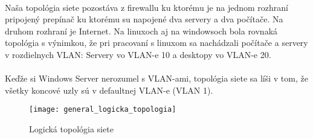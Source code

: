 \paragraph{}
Naša topológia siete pozostáva z firewallu ku ktorému je na jednom rozhraní pripojený prepínač ku ktorému su napojené dva servery a dva počítače. Na druhom rozhraní je Internet. Na linuxoch aj na windowsoch bola rovnaká topológia s výnimkou, že pri pracovaní s linuxom sa nachádzali počítače a servery v rozdielnych VLAN: Servery vo VLAN-e 10 a desktopy vo VLAN-e 20.
\paragraph{}
Keďže si Windows Server nerozumel s VLAN-ami, topológia siete sa líši v tom, že všetky koncové uzly sú v defaultnej VLAN-e (VLAN 1).

\begin{figure}[h]
\centering
\texttt{[image: general\_logicka\_topologia]}
\caption{Logická topológia siete}
\label{fig:x log_topologia}
\end{figure}
